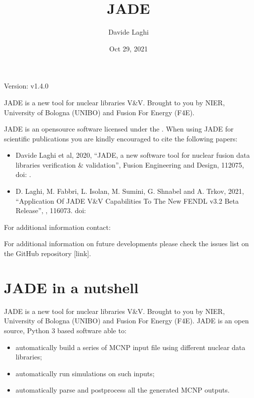 \documentclass[letterpaper,10pt,english]{sphinxmanual}
\title{JADE}
\date{Oct 29, 2021}
\author{Davide Laghi}
\let\sphinxpxdimen\pdfpxdimen\else\newdimen\sphinxpxdimen
\begin{document}
\pagestyle{empty}
\sphinxmaketitle
\pagestyle{plain}
\sphinxtableofcontents
\pagestyle{normal}
\label{\detokenize{index::doc}}


Version: v1.4.0

JADE is a new tool for nuclear libraries V\&V.
Brought to you by NIER, University of Bologna (UNIBO) and Fusion For Energy (F4E).

JADE is an open\sphinxhyphen{}source software licensed under the {\hyperref[\detokenize{LICENSE:gnulicense}]{}}.
When using JADE for scientific publications you are kindly encouraged to cite the following papers:
\begin{itemize}
\item {} 
Davide Laghi et al, 2020, “JADE, a new software tool for nuclear fusion data libraries verification \& validation”,
Fusion Engineering and Design,  112075, doi: .

\item {} 
D. Laghi, M. Fabbri, L. Isolan, M. Sumini, G. Shnabel and A. Trkov, 2021,
“Application Of JADE V\&V Capabilities To The New FENDL v3.2 Beta Release”,
,  116073. doi: 

\end{itemize}

For additional information contact: 

For additional information on future developments please check the issues list on the
GitHub repository {[}link{]}.


\chapter{JADE in a nutshell}
\label{\detokenize{nutshell:jade-in-a-nutshell}}\label{\detokenize{nutshell::doc}}
\noindent\sphinxincludegraphics[width=600\sphinxpxdimen]{{scheme}.png}

JADE is a new tool for nuclear libraries V\&V.
Brought to you by NIER, University of Bologna (UNIBO) and Fusion For Energy (F4E).
JADE is an open source, Python 3 based software able to:
\begin{itemize}
\item {} 
automatically build a series of MCNP input file using different nuclear
data libraries;

\item {} 
automatically run simulations on such inputs;

\item {} 
automatically parse and post\sphinxhyphen{}process all the generated MCNP outputs.

\end{itemize}
\end{document}
